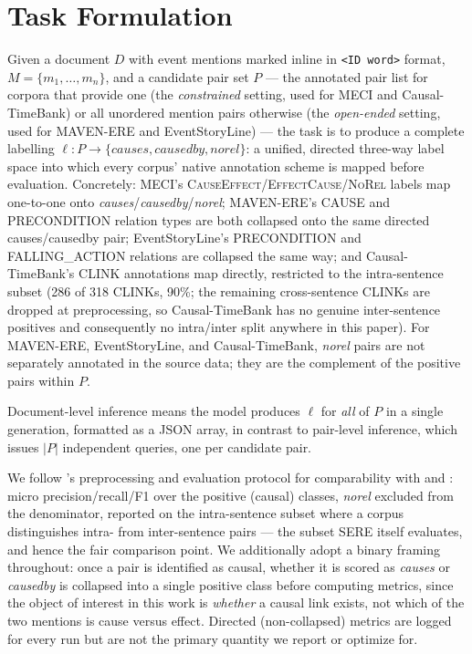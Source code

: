 \documentclass[11pt]{article}
\begin{document}
\section{Task Formulation}
\label{sec:task}

Given a document $D$ with event mentions marked inline in \texttt{<ID word>}
format, $M = \{m_1, \dots, m_n\}$, and a candidate pair set $P$ --- the annotated
pair list for corpora that provide one (the \emph{constrained} setting, used for
MECI and Causal-TimeBank) or all unordered mention pairs otherwise (the
\emph{open-ended} setting, used for MAVEN-ERE and EventStoryLine) --- the task is to
produce a complete labelling $\ell: P \to \{\textit{causes}, \textit{causedby},
\textit{norel}\}$: a unified, directed three-way label space into which every
corpus' native annotation scheme is mapped before evaluation. Concretely: MECI's
\textsc{CauseEffect}/\textsc{EffectCause}/\textsc{NoRel} labels map one-to-one onto
\textit{causes}/\textit{causedby}/\textit{norel}; MAVEN-ERE's \textsc{CAUSE} and
\textsc{PRECONDITION} relation types are both collapsed onto the same directed
causes/causedby pair; EventStoryLine's \textsc{PRECONDITION} and
\textsc{FALLING\_ACTION} relations are collapsed the same way; and Causal-TimeBank's
CLINK annotations map directly, restricted to the intra-sentence subset (286 of 318
CLINKs, 90\%; the remaining cross-sentence CLINKs are dropped at preprocessing, so
Causal-TimeBank has no genuine inter-sentence positives and consequently no
intra/inter split anywhere in this paper). For MAVEN-ERE, EventStoryLine, and
Causal-TimeBank, \textit{norel} pairs are not separately annotated in the source
data; they are the complement of the positive pairs within $P$.

Document-level inference means the model produces $\ell$ for \emph{all} of $P$ in a
single generation, formatted as a JSON array, in contrast to pair-level inference,
which issues $|P|$ independent queries, one per candidate pair.

We follow \citet{gao2023chatgpt}'s preprocessing and evaluation protocol for
comparability with \citet{hao2026sere} and \citet{cai2025dreci}: micro
precision/recall/F1 over the positive (causal) classes, \textit{norel} excluded from
the denominator, reported on the intra-sentence subset where a corpus distinguishes
intra- from inter-sentence pairs --- the subset SERE itself evaluates, and hence the
fair comparison point. We additionally adopt a binary framing throughout: once a
pair is identified as causal, whether it is scored as \textit{causes} or
\textit{causedby} is collapsed into a single positive class before computing
metrics, since the object of interest in this work is \emph{whether} a causal link
exists, not which of the two mentions is cause versus effect. Directed
(non-collapsed) metrics are logged for every run but are not the primary quantity we
report or optimize for.
\end{document}
